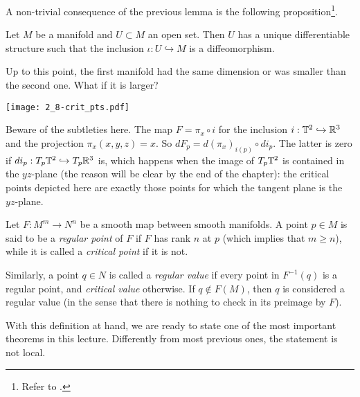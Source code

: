 A non-trivial consequence of the previous lemma is the following proposition\footnote{Refer to \cite[Proposition 5.8 and Proposition 5.31]{book:lee}.}.

\begin{proposition}\label{prop:uniqdiffeoinclusion}
  Let $M$ be a manifold and $U\subset M$ an open set.
  Then $U$ has a unique differentiable structure such that the inclusion $\iota:U\hookrightarrow M$ is a diffeomorphism.
\end{proposition}

Up to this point, the first manifold had the same dimension or was smaller than the second one.
What if it is larger?

\begin{marginfigure}
  \texttt{[image: 2\_8-crit\_pts.pdf]}
  \caption{Beware of the subtleties here. The map $F=\pi_x\circ i$ for the inclusion $i:\mathbb{T}^2\hookrightarrow\mathbb{R}^3$ and the projection $\pi_x(x,y,z)=x$.
  So $dF_p = d (\pi_x)_{i(p)} \circ d i_p$. The latter is zero if $d i_p: T_p\mathbb{T}^2\hookrightarrow T_p\mathbb{R}^3$ is, which happens when the image of $T_p\mathbb{T}^2$ is contained in the $yz$-plane (the reason will be clear by the end of the chapter): the critical points depicted here are exactly those points for which the tangent plane is the $yz$-plane.}
\end{marginfigure}
\begin{definition}
  Let $F:M^m \to N^n$ be a smooth map between smooth manifolds.
  A point $p\in M$ is said to be a \emph{regular point} of $F$ if $F$ has rank $n$ at $p$ (which implies that $m\geq n$), while it is called a \emph{critical point} if it is not.

  Similarly, a point $q\in N$ is called a \emph{regular value} if every point in $F^{-1}(q)$ is a regular point, and \emph{critical value} otherwise. If $q\not\in F(M)$, then $q$ is considered a regular value (in the sense that there is nothing to check in its preimage by $F$).
\end{definition}

With this definition at hand, we are ready to state one of the most important theorems in this lecture. Differently from most previous ones, the statement is not local.

